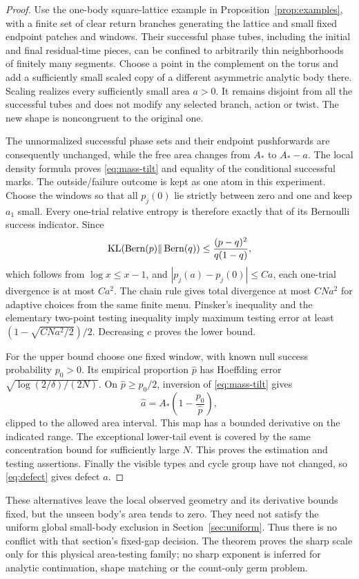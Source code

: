 \begin{proof}
Use the one-body square-lattice example in Proposition~\ref{prop:examples},
with a finite set of clear return branches generating the lattice and
small fixed endpoint patches and windows. Their successful phase tubes,
including the initial and final residual-time pieces, can be confined
to arbitrarily thin neighborhoods of finitely many segments. Choose a
point in the complement on the torus and add a sufficiently small scaled
copy of a different asymmetric analytic body there. Scaling realizes
every sufficiently small area $a>0$. It remains disjoint from all the
successful tubes and does not modify any selected branch, action or
twist. The new shape is noncongruent to the original one.

The unnormalized successful phase sets and their endpoint pushforwards
are consequently unchanged, while the free area changes from $A_*$
to $A_*-a$. The local density formula proves \eqref{eq:mass-tilt} and
equality of the conditional successful marks. The outside/failure outcome
is kept as one atom in this experiment. Choose the windows so that all
$p_j(0)$ lie strictly between zero and one and keep $a_1$ small. Every
one-trial relative entropy is therefore exactly that of its Bernoulli
success indicator. Since
\[
 \operatorname{KL}(\operatorname{Bern}(p)\Vert\operatorname{Bern}(q))
                  \le\frac{(p-q)^2}{q(1-q)},
\]
which follows from $\log x\le x-1$, and
$|p_j(a)-p_j(0)|\le Ca$, each one-trial divergence is at most $Ca^2$.
The chain rule gives total divergence at most $CNa^2$ for adaptive
choices from the same finite menu. Pinsker's inequality and the elementary
two-point testing inequality imply maximum testing error at least
$(1-\sqrt{CNa^2/2})/2$. Decreasing $c$ proves the lower bound.

For the upper bound choose one fixed window, with known null success
probability $p_0>0$. Its empirical proportion $\widehat p$ has
Hoeffding error $\sqrt{\log(2/\delta)/(2N)}$. On
$\widehat p\ge p_0/2$, inversion of \eqref{eq:mass-tilt} gives
\[
               \widehat a=A_*\left(1-\frac{p_0}{\widehat p}\right),
\]
clipped to the allowed area interval. This map has a bounded derivative
on the indicated range. The exceptional lower-tail event is covered by
the same concentration bound for sufficiently large $N$. This proves
the estimation and testing assertions. Finally the visible types and
cycle group have not changed, so \eqref{eq:defect} gives defect $a$.
\end{proof}

These alternatives leave the local observed geometry and its derivative
bounds fixed, but the unseen body's area tends to zero. They need not
satisfy the uniform global small-body exclusion in
Section~\ref{sec:uniform}. Thus there is no conflict with that section's
fixed-gap decision. The theorem proves the sharp scale only for this
physical area-testing family; no sharp exponent is inferred for analytic
continuation, shape matching or the count-only germ problem.
